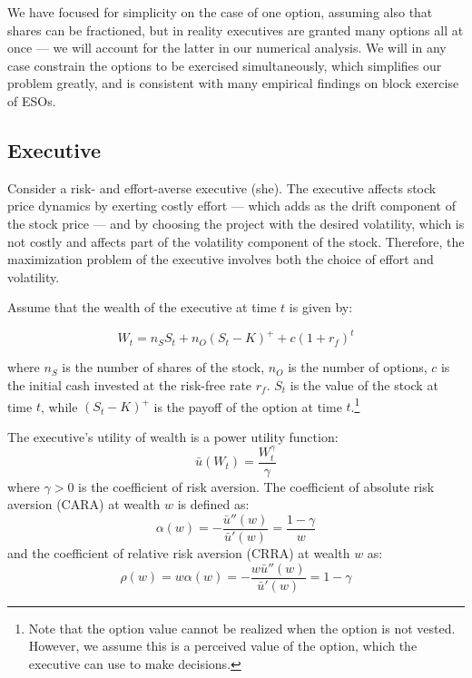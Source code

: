 We have focused for simplicity on the case of one option, assuming also that shares can be fractioned, but in reality executives are granted many options all at once --- we will account for the latter in our numerical analysis. We will in any case constrain the options to be exercised simultaneously, which simplifies our problem greatly, and is consistent with many empirical findings on block exercise of ESOs.



\subsection{Executive}
Consider a risk- and effort-averse executive (she). The executive affects stock price dynamics by exerting costly effort --- which adds as the drift component of the stock price --- and by choosing the project with the desired volatility, which is not costly and affects part of the volatility component of the stock. Therefore, the maximization problem of the executive involves both the choice of effort and volatility. 

Assume that the wealth of the executive at time $t$ is given by: 

$$ W_t = n_S S_t + n_O (S_t-K)^+ + c(1+r_f)^t   $$ 

where $n_S$ is the number of shares of the stock, $n_O$ is the number of options, $c$ is the initial cash invested at the risk-free rate $r_f$. $S_t$ is the value of the stock at time $t$, while $(S_t-K)^+$ is the payoff of the option at time $t$.\footnote{Note that the option value cannot be realized when the option is not vested. However, we assume this is a perceived value of the option, which the executive can use to make decisions.}

The executive's utility of wealth is a power utility function:
$$ \bar{u}(W_t) = \frac{W_t^{\gamma}}{\gamma} $$
where $\gamma > 0$ is the coefficient of risk aversion. The coefficient of absolute risk aversion (CARA) at wealth $w$ is defined as:
$$\alpha(w) = -\frac{\bar{u}''(w)}{\bar{u}'(w)} = \frac{1-\gamma}{w}$$
and the coefficient of relative risk aversion (CRRA) at wealth $w$ as:
$$ \rho(w) = w \alpha(w) = -\frac{w\bar{u}''(w)}{\bar{u}'(w)} = 1-\gamma$$

